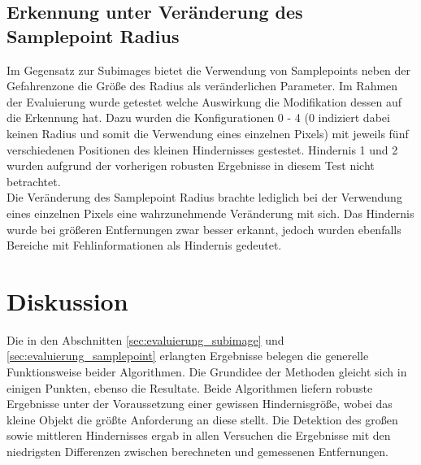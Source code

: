 

% 


\subsection{Erkennung unter Veränderung des Samplepoint Radius}
\label{subsec:test_samplepoint_radius}

Im Gegensatz zur Subimages bietet die Verwendung von Samplepoints neben der Gefahrenzone die Größe des Radius als veränderlichen Parameter. Im Rahmen der Evaluierung wurde getestet welche Auswirkung die Modifikation dessen auf die Erkennung hat. Dazu wurden die Konfigurationen 0 - 4 (0 indiziert dabei keinen Radius und somit die Verwendung eines einzelnen Pixels) mit jeweils fünf verschiedenen Positionen des kleinen Hindernisses gestestet. Hindernis 1 und 2 wurden aufgrund der vorherigen robusten Ergebnisse in diesem Test nicht betrachtet.\\

\noindent
Die Veränderung des Samplepoint Radius brachte lediglich bei der Verwendung eines einzelnen Pixels eine wahrzunehmende Veränderung mit sich. Das Hindernis wurde bei größeren Entfernungen zwar besser erkannt, jedoch wurden ebenfalls Bereiche mit Fehlinformationen als Hindernis gedeutet.

\section{Diskussion}
\label{sec:evaluation_Diskussion}

Die in den Abschnitten \ref{sec:evaluierung_subimage} und \ref{sec:evaluierung_samplepoint} erlangten Ergebnisse belegen die generelle Funktionsweise beider Algorithmen. Die Grundidee der Methoden gleicht sich in einigen Punkten, ebenso die Resultate. Beide Algorithmen liefern robuste Ergebnisse unter der Voraussetzung einer gewissen Hindernisgröße, wobei das kleine Objekt die größte Anforderung an diese stellt. Die Detektion des großen sowie mittleren Hindernisses ergab in allen Versuchen die Ergebnisse mit den niedrigsten Differenzen zwischen berechneten und gemessenen Entfernungen.\\

